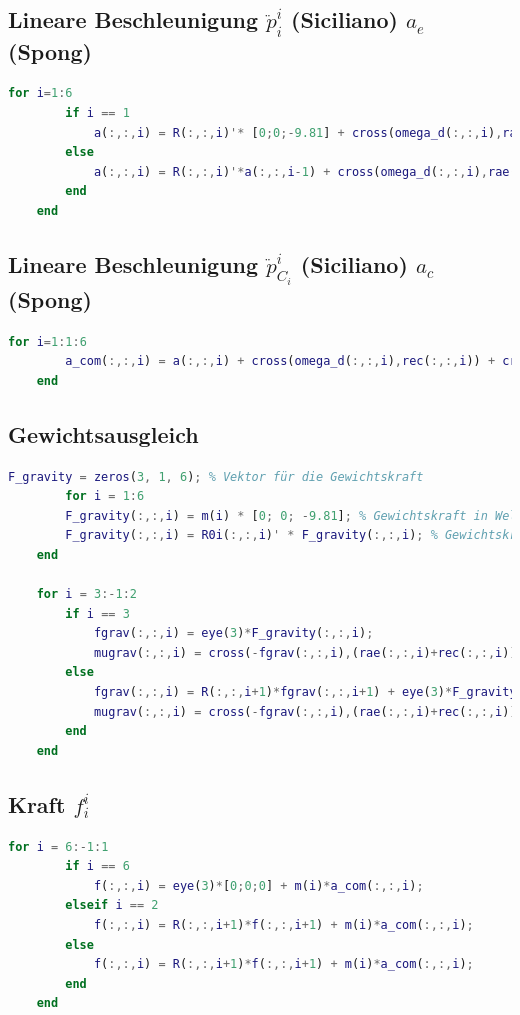 \subsection{Lineare Beschleunigung $\ddot p^{i}_i$ (Siciliano) $a_e$ (Spong)}
%
\begin{lstlisting}[language=Matlab, numbers=none]
	for i=1:6
		if i == 1
			a(:,:,i) = R(:,:,i)'* [0;0;-9.81] + cross(omega_d(:,:,i),rae(:,:,i)) + cross(omega(:,:,i),(cross(omega(:,:,i), rae(:,:,i))));
		else
			a(:,:,i) = R(:,:,i)'*a(:,:,i-1) + cross(omega_d(:,:,i),rae(:,:,i)) + cross(omega(:,:,i),(cross(omega(:,:,i), rae(:,:,i))));
		end
	end
\end{lstlisting}
%
\subsection{Lineare Beschleunigung $\ddot p^{i}_{C_i}$ (Siciliano) $a_c$ (Spong)}
%
\begin{lstlisting}[language=Matlab, numbers=none]
	for i=1:1:6
		a_com(:,:,i) = a(:,:,i) + cross(omega_d(:,:,i),rec(:,:,i)) + cross(omega(:,:,i),(cross(omega(:,:,i), rec(:,:,i))));
	end
\end{lstlisting}
%
\subsection{Gewichtsausgleich}
%
\begin{lstlisting}[language=Matlab, numbers=none]
	F_gravity = zeros(3, 1, 6); % Vektor für die Gewichtskraft
		for i = 1:6
		F_gravity(:,:,i) = m(i) * [0; 0; -9.81]; % Gewichtskraft in Weltkoordinaten
		F_gravity(:,:,i) = R0i(:,:,i)' * F_gravity(:,:,i); % Gewichtskraft ins Körpersystem transformieren
	end
	
	for i = 3:-1:2
		if i == 3
			fgrav(:,:,i) = eye(3)*F_gravity(:,:,i);
			mugrav(:,:,i) = cross(-fgrav(:,:,i),(rae(:,:,i)+rec(:,:,i)));
		else
			fgrav(:,:,i) = R(:,:,i+1)*fgrav(:,:,i+1) + eye(3)*F_gravity(:,:,i);
			mugrav(:,:,i) = cross(-fgrav(:,:,i),(rae(:,:,i)+rec(:,:,i))) + R(:,:,i+1)*mugrav(:,:,i+1) + R(:,:,i+1)*cross(fgrav(:,:,i+1), rec(:,:,i));
		end
	end
\end{lstlisting}
%
\subsection{Kraft $f^{i}_i$}
%
\begin{lstlisting}[language=Matlab, numbers=none]
	for i = 6:-1:1
		if i == 6
			f(:,:,i) = eye(3)*[0;0;0] + m(i)*a_com(:,:,i);
		elseif i == 2
			f(:,:,i) = R(:,:,i+1)*f(:,:,i+1) + m(i)*a_com(:,:,i);
		else
			f(:,:,i) = R(:,:,i+1)*f(:,:,i+1) + m(i)*a_com(:,:,i);
		end
	end
\end{lstlisting}
%
